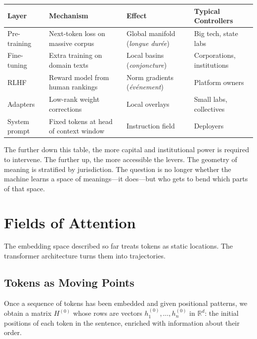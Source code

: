 \documentclass[12pt,a4paper]{article}
\begin{document}
\begin{formalbox}[title={Depths of Control in the Substrate}]
\begin{tabular}{@{}llll@{}}
\toprule
\textbf{Layer}      & \textbf{Mechanism}                             & \textbf{Effect}                                  & \textbf{Typical Controllers} \\ \midrule
Pre-training        & Next-token loss on massive corpus              & Global manifold (\emph{longue dur\'{e}e})        & Big tech, state labs         \\
Fine-tuning         & Extra training on domain texts                 & Local basins (\emph{conjoncture})                & Corporations, institutions   \\
RLHF                & Reward model from human rankings               & Norm gradients (\emph{\'{e}v\'{e}nement})        & Platform owners              \\
Adapters            & Low-rank weight corrections                    & Local overlays                                   & Small labs, collectives      \\
System prompt       & Fixed tokens at head of context window         & Instruction field                                & Deployers                    \\ \bottomrule
\end{tabular}
\end{formalbox}

The further down this table, the more capital and institutional power is required to intervene. The further up, the more accessible the levers. The geometry of meaning is stratified by jurisdiction. The question is no longer whether the machine learns a space of meanings---it does---but who gets to bend which parts of that space.

\section{Fields of Attention}

The embedding space described so far treats tokens as static locations. The transformer architecture turns them into trajectories.

\subsection{Tokens as Moving Points}

Once a sequence of tokens has been embedded and given positional patterns, we obtain a matrix $H^{(0)}$ whose rows are vectors $h^{(0)}_1,\dots,h^{(0)}_n$ in $\mathbb{R}^d$: the initial positions of each token in the sentence, enriched with information about their order.
\end{document}
